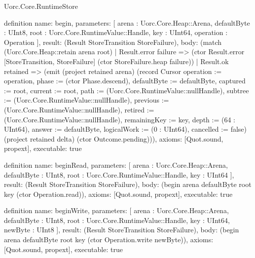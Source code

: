 \begin{lexlean}{Uorc.Core.RuntimeStore}
\begin{semanticmodule}
definition{
  name: begin,
  parameters: [
    arena : Uorc.Core.Heap::Arena,
    defaultByte : UInt8,
    root : Uorc.Core.RuntimeValue::Handle,
    key : UInt64,
    operation : Operation
  ],
  result: (Result StoreTransition StoreFailure),
  body: (match (Uorc.Core.Heap::retain arena root)
    | Result.error failure => (ctor Result.error [StoreTransition, StoreFailure] (ctor StoreFailure.heap failure))
    | Result.ok retained => (emit (project retained arena) (record Cursor {operation := operation, phase := (ctor Phase.descend), defaultByte := defaultByte, captured := root, current := root, path := (Uorc.Core.RuntimeValue::nullHandle), subtree := (Uorc.Core.RuntimeValue::nullHandle), previous := (Uorc.Core.RuntimeValue::nullHandle), retired := (Uorc.Core.RuntimeValue::nullHandle), remainingKey := key, depth := (64 : UInt64), answer := defaultByte, logicalWork := (0 : UInt64), cancelled := false}) (project retained delta) (ctor Outcome.pending))),
  axioms: [Quot.sound, propext],
  executable: true
}

definition{
  name: beginRead,
  parameters: [
    arena : Uorc.Core.Heap::Arena,
    defaultByte : UInt8,
    root : Uorc.Core.RuntimeValue::Handle,
    key : UInt64
  ],
  result: (Result StoreTransition StoreFailure),
  body: (begin arena defaultByte root key (ctor Operation.read)),
  axioms: [Quot.sound, propext],
  executable: true
}

definition{
  name: beginWrite,
  parameters: [
    arena : Uorc.Core.Heap::Arena,
    defaultByte : UInt8,
    root : Uorc.Core.RuntimeValue::Handle,
    key : UInt64,
    newByte : UInt8
  ],
  result: (Result StoreTransition StoreFailure),
  body: (begin arena defaultByte root key (ctor Operation.write newByte)),
  axioms: [Quot.sound, propext],
  executable: true
}


\end{semanticmodule}
\end{lexlean}
